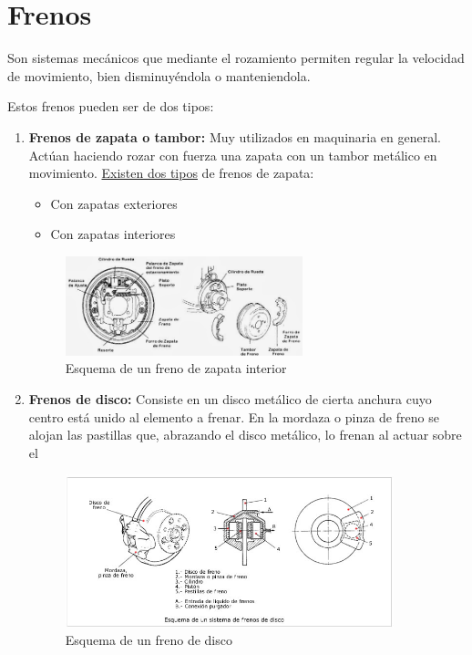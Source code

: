 \documentclass[a4paper,12pt,oneside]{book}
\begin{document}
\section{Frenos}
\label{sec:org1bb980f}

Son sistemas mecánicos que mediante el rozamiento permiten regular la velocidad
de movimiento, bien disminuyéndola o manteniendola.

Estos frenos pueden ser de dos tipos:
\begin{enumerate}
\item \textbf{Frenos de zapata o tambor:} Muy utilizados en maquinaria en general. Actúan haciendo
rozar con fuerza una zapata con un tambor metálico en movimiento. \uline{Existen
dos tipos} de frenos de zapata: 
\begin{itemize}
\item Con zapatas exteriores
\item Con zapatas interiores
\end{itemize}
\begin{figure}[htbp]
\centering
\includegraphics[width=0.65\textwidth]{./img_0009/freno_tambor.jpg}
\caption{Esquema de un freno de zapata interior}
\end{figure}
\item \textbf{Frenos de disco:} Consiste en un disco metálico de cierta anchura cuyo
centro está unido al elemento a frenar. En la mordaza o pinza de freno se
alojan las pastillas que, abrazando el disco metálico, lo frenan al actuar
sobre el

\begin{figure}[htbp]
\centering
\includegraphics[width=0.9\textwidth]{./img_0009/freno_disco.jpg}
\caption{Esquema de un freno de disco}
\end{figure}
\end{enumerate}
\end{document}
